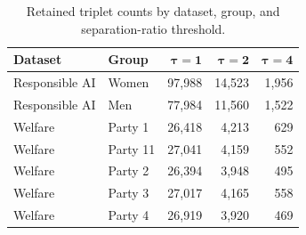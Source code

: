 \begin{table}[t]
\centering
\small
\caption{Retained triplet counts by dataset, group, and separation-ratio threshold.}
\label{tab:group-triplet-counts}
\begin{tabular}{llrrr}
\toprule
\textbf{Dataset} & \textbf{Group} & $\mathbf{\tau=1}$ & $\mathbf{\tau=2}$ & $\mathbf{\tau=4}$ \\
\midrule
Responsible AI & Women & 97,988 & 14,523 & 1,956 \\
Responsible AI & Men & 77,984 & 11,560 & 1,522 \\
Welfare & Party 1 & 26,418 & 4,213 & 629 \\
Welfare & Party 11 & 27,041 & 4,159 & 552 \\
Welfare & Party 2 & 26,394 & 3,948 & 495 \\
Welfare & Party 3 & 27,017 & 4,165 & 558 \\
Welfare & Party 4 & 26,919 & 3,920 & 469 \\
\bottomrule
\end{tabular}
\end{table}
